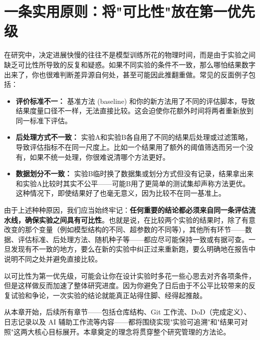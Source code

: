 \section{一条实用原则：将"可比性"放在第一优先级}

在研究中，决定进展快慢的往往不是模型训练所花的物理时间，而是由于实验之间缺乏可比性所导致的反复和疑惑。如果不同实验的条件不一致，那么哪怕结果数字出来了，你也很难判断差异源自何处，甚至可能因此推翻重做。常见的反面例子包括：

\begin{itemize}
  \item \textbf{评价标准不一：} 基准方法 (baseline) 和你的新方法用了不同的评估脚本，导致结果度量口径不一样，无法直接比较。这会迫使你花额外时间将两者重新放到同一标准下评估。

  \item \textbf{后处理方式不一致：} 实验A和实验B各自用了不同的结果后处理或过滤策略，导致评估指标不在同一尺度上。比如一个结果用了额外的阈值筛选而另一个没有，如果不统一处理，你很难说清哪个方法更好。

  \item \textbf{数据划分不一致：} 实验B临时换了数据集或划分方式但没有记录，结果拿出来和实验A比较时其实不公平——可能B用了更简单的测试集却声称方法更优。这种情况下，即使结果好了也毫无意义，因为比较不在同一基准上。
\end{itemize}

由于上述种种原因，我们应当始终牢记：\textbf{任何重要的结论都必须来自同一条评估流水线，确保实验之间具有可比性}。也就是说，在比较两个实验的结果时，除了有意改变的那个变量（例如模型结构的不同、超参数的不同等），其他所有环节——数据、评估标准、后处理方法、随机种子等——都应尽可能保持一致或有据可查。一旦发现有不一致的地方，要么在新的实验中纠正过来重新跑，要么明确地在报告中说明不同之处并避免直接比较。

以可比性为第一优先级，可能会让你在设计实验时多花一些心思去对齐各项条件，但是这样做反而加速了整体研究进度。因为你避免了日后由于不公平比较带来的反复试验和争论，一次实验的结论就能真正站得住脚、经得起推敲。

从本章开始，后续所有章节——包括仓库结构、Git 工作流、DoD（完成定义）、日志记录以及 AI 辅助工作流等内容——都将围绕实现"实验可追溯"和"结果可对照"这两大核心目标展开。本章奠定的理念将贯穿整个研究管理的方法论。
